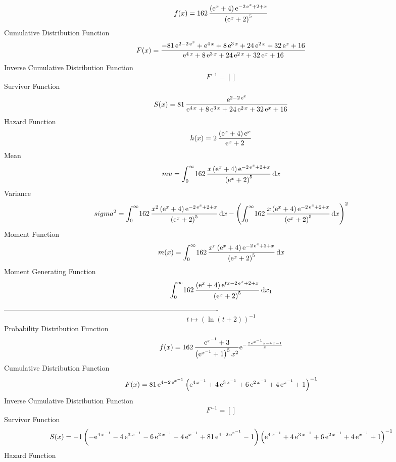 \documentclass[12pt]{article}
\begin{document}
$$  f(x)=162\,{\frac { \left( {{\rm e}^{x}}+4 \right) {{\rm e}^{-2\,{{\rm e}^{x
}}+2+x}}}{ \left( {{\rm e}^{x}}+2 \right) ^{5}}}
$$Cumulative Distribution Function  
 $$F(x)={\frac {-81\,{{\rm e}^{2-2\,{{\rm e}^{x}}}}+{{\rm e}^{4\,x}}+8\,{
{\rm e}^{3\,x}}+24\,{{\rm e}^{2\,x}}+32\,{{\rm e}^{x}}+16}{{{\rm e}^{4
\,x}}+8\,{{\rm e}^{3\,x}}+24\,{{\rm e}^{2\,x}}+32\,{{\rm e}^{x}}+16}}
$$ Inverse Cumulative Distribution Function 
  $$F^{-1} = []
$$Survivor Function 
 $$ S(x)=81\,{\frac {{{\rm e}^{2-2\,{{\rm e}^{x}}}}}{{{\rm e}^{4\,x}}+8\,{
{\rm e}^{3\,x}}+24\,{{\rm e}^{2\,x}}+32\,{{\rm e}^{x}}+16}}
$$ Hazard Function 
 $$ h(x)=2\,{\frac { \left( {{\rm e}^{x}}+4 \right) {{\rm e}^{x}}}{{{\rm e}^{x}
}+2}}
$$Mean 
 $$ mu=\int_{0}^{\infty }\!162\,{\frac {x \left( {{\rm e}^{x}}+4 \right) {
{\rm e}^{-2\,{{\rm e}^{x}}+2+x}}}{ \left( {{\rm e}^{x}}+2 \right) ^{5}
}}\,{\rm d}x
$$ Variance 
 $$ sigma^2 = \int_{0}^{\infty }\!162\,{\frac {{x}^{2} \left( {{\rm e}^{x}}+4
 \right) {{\rm e}^{-2\,{{\rm e}^{x}}+2+x}}}{ \left( {{\rm e}^{x}}+2
 \right) ^{5}}}\,{\rm d}x- \left( \int_{0}^{\infty }\!162\,{\frac {x
 \left( {{\rm e}^{x}}+4 \right) {{\rm e}^{-2\,{{\rm e}^{x}}+2+x}}}{
 \left( {{\rm e}^{x}}+2 \right) ^{5}}}\,{\rm d}x \right) ^{2}
$$Moment Function 
 $$ m(x) = \int_{0}^{\infty }\!162\,{\frac {{x}^{r} \left( {{\rm e}^{x}}+4
 \right) {{\rm e}^{-2\,{{\rm e}^{x}}+2+x}}}{ \left( {{\rm e}^{x}}+2
 \right) ^{5}}}\,{\rm d}x
$$ Moment Generating Function 
 $$\int_{0}^{\infty }\!162\,{\frac { \left( {{\rm e}^{x}}+4 \right) {
{\rm e}^{tx-2\,{{\rm e}^{x}}+2+x}}}{ \left( {{\rm e}^{x}}+2 \right) ^{
5}}}\,{\rm d}x_{{1}}
$$-------------------------------------------------------------------------------------------  \\$$t\mapsto  \left( \ln  \left( t+2 \right)  \right) ^{-1}
$$Probability Distribution Function 
$$  f(x)=162\,{\frac {{{\rm e}^{{x}^{-1}}}+3}{ \left( {{\rm e}^{{x}^{-1}}}+1
 \right) ^{5}{x}^{2}}{{\rm e}^{-{\frac {2\,{{\rm e}^{{x}^{-1}}}x-4\,x-
1}{x}}}}}
$$Cumulative Distribution Function  
 $$F(x)=81\,{{{\rm e}^{4-2\,{{\rm e}^{{x}^{-1}}}}} \left( {{\rm e}^{4\,{x}^{-1
}}}+4\,{{\rm e}^{3\,{x}^{-1}}}+6\,{{\rm e}^{2\,{x}^{-1}}}+4\,{{\rm e}^
{{x}^{-1}}}+1 \right) ^{-1}}
$$ Inverse Cumulative Distribution Function 
  $$F^{-1} = []
$$Survivor Function 
 $$ S(x)=-{1 \left( -{{\rm e}^{4\,{x}^{-1}}}-4\,{{\rm e}^{3\,{x}^{-1}}}-6\,{
{\rm e}^{2\,{x}^{-1}}}-4\,{{\rm e}^{{x}^{-1}}}+81\,{{\rm e}^{4-2\,{
{\rm e}^{{x}^{-1}}}}}-1 \right)  \left( {{\rm e}^{4\,{x}^{-1}}}+4\,{
{\rm e}^{3\,{x}^{-1}}}+6\,{{\rm e}^{2\,{x}^{-1}}}+4\,{{\rm e}^{{x}^{-1
}}}+1 \right) ^{-1}}
$$ Hazard Function 
\end{document}
